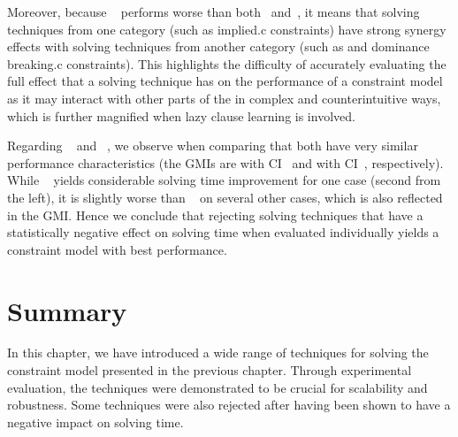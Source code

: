 Moreover, because ~\modelE{} performs worse than both
~\modelC and~\modelD, it means that solving
techniques from one category (such as \gls{implied.c} \glspl{constraint}) have
strong synergy effects with solving techniques from another category (such as
 and \gls{dominance breaking.c}
\glspl{constraint}).
%
This highlights the difficulty of accurately evaluating the full effect that a
solving technique has on the performance of a \gls{constraint model} as it may
interact with other parts of the  in complex and
counterintuitive ways, which is further magnified when \gls{lazy clause
  learning} is involved.

Regarding ~\modelC{} and ~\modelD, we observe when comparing
 that both
 have very similar performance characteristics (the
\glspl{GMI} are \printGMI{%
  \SolvTechDisableAllBadPrePlusSolvingTimeSpeedupPrePlusSolvingTimeRegularSpeedupGmean%
} with \gls{CI}~\printGMICI{%
  \SolvTechDisableAllBadPrePlusSolvingTimeSpeedupPrePlusSolvingTimeRegularSpeedupCiMin%
}{%
  \SolvTechDisableAllBadPrePlusSolvingTimeSpeedupPrePlusSolvingTimeRegularSpeedupCiMax%
} and \printGMI{%
  \SolvTechDisableAllPrePlusSolvingTimeSpeedupPrePlusSolvingTimeRegularSpeedupGmean%
} with \gls{CI}~\printGMICI{%
  \SolvTechDisableAllPrePlusSolvingTimeSpeedupPrePlusSolvingTimeRegularSpeedupCiMin%
}{%
  \SolvTechDisableAllPrePlusSolvingTimeSpeedupPrePlusSolvingTimeRegularSpeedupCiMax%
}, respectively).
%
While ~\modelD{} yields considerable solving time
improvement for one case (second from the left), it is slightly worse than
~\modelC{} on several other cases, which is also
reflected in the \gls{GMI}.
%
Hence we conclude that rejecting solving techniques that have a statistically
negative effect on solving time when evaluated individually yields a
\gls{constraint model} with best performance.


\section{Summary}

In this chapter, we have introduced a wide range of techniques for solving the
\gls{constraint model} presented in the previous chapter.
%
Through experimental evaluation, the techniques were demonstrated to be
crucial for scalability and robustness.
%
Some techniques were also rejected after having been shown to have a negative
impact on solving time.
